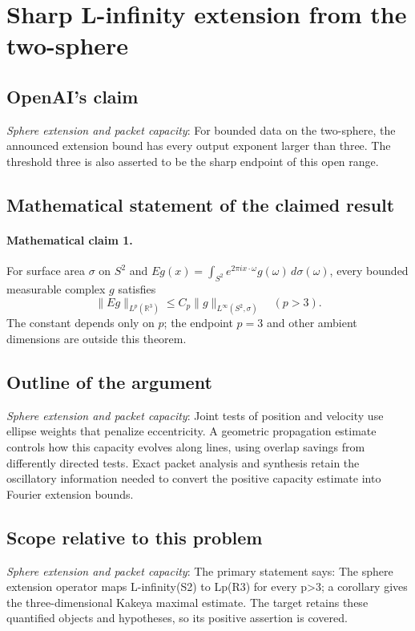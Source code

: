 \documentclass[11pt]{article}
\begin{document}
\section*{Sharp L-infinity extension from the two-sphere}

\subsection{OpenAI's claim}
\textit{Sphere extension and packet capacity}: For bounded data on the two-sphere, the announced extension bound has every output exponent larger than three. The threshold three is also asserted to be the sharp endpoint of this open range.

\subsection{Mathematical statement of the claimed result}
\paragraph{Mathematical claim 1.} For surface area $\sigma$ on $S^2$ and $Eg(x)=\int_{S^2}e^{2\pi ix\cdot\omega}g(\omega)\,d\sigma(\omega)$, every bounded measurable complex $g$ satisfies \[\|Eg\|_{L^p(\mathbb R^3)}\le C_p\|g\|_{L^\infty(S^2,\sigma)}\quad(p>3).\] The constant depends only on $p$; the endpoint $p=3$ and other ambient dimensions are outside this theorem.

\subsection{Outline of the argument}
\textit{Sphere extension and packet capacity}: Joint tests of position and velocity use ellipse weights that penalize eccentricity. A geometric propagation estimate controls how this capacity evolves along lines, using overlap savings from differently directed tests. Exact packet analysis and synthesis retain the oscillatory information needed to convert the positive capacity estimate into Fourier extension bounds.

\subsection{Scope relative to this problem}
\textit{Sphere extension and packet capacity}: The primary statement says: The sphere extension operator maps L-infinity(S2) to Lp(R3) for every p>3; a corollary gives the three-dimensional Kakeya maximal estimate. The target retains these quantified objects and hypotheses, so its positive assertion is covered.
\end{document}
